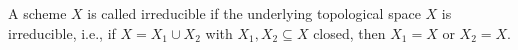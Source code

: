 A scheme $X$ is called irreducible if the underlying topological space $X$ is
irreducible, i.e., if $X = X_1 \cup X_2$ with $X_1, X_2 \subseteq X$ closed,
then $X_1 = X$ or $X_2 = X$.
